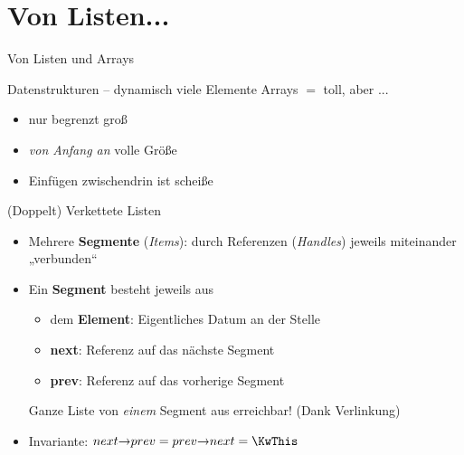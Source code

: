 	

\section{Von Listen...}
\begin{headframe}
	Von Listen und Arrays
\end{headframe}
	
\begin{frame}{Datenstrukturen – dynamisch viele Elemente}
	Arrays $=$ toll, aber ...
		\pause
		\begin{itemize}
			\item[\Cons] nur begrenzt groß
			\pause
			\item[\Cons] \emph{von Anfang an} volle Größe
			\pause
			\item[\Cons] Einfügen zwischendrin ist scheiße
		\end{itemize}
\end{frame}

\begin{frame}{(Doppelt) Verkettete Listen}
	\begin{itemize}
		\item Mehrere \textbf{Segmente} (\emph{Items}): durch Referenzen  (\emph{Handles}) jeweils miteinander „verbunden“
		\pause
		\item Ein \textbf{Segment} besteht jeweils aus
		\begin{itemize}
			\item dem \textbf{Element}: Eigentliches Datum an der Stelle
			\pause
			\item \textbf{next}: Referenz auf das nächste Segment
			\pause
			\item \textbf{prev}: Referenz auf das vorherige Segment
		\end{itemize}
		\pause
		\implitem Ganze Liste von \textit{einem} Segment aus erreichbar! (Dank Verlinkung)
		\pause 
		\item Invariante: $next \access prev = prev \access next = \KwThis$
	\end{itemize}
\end{frame}

